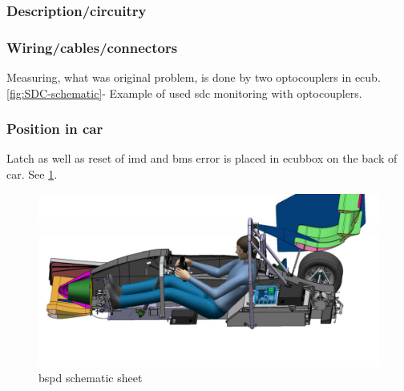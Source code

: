 \subsubsection{Description/circuitry}

\subsubsection{Wiring/cables/connectors}

Measuring, what was original problem, is done by two optocouplers in \gls{ecub}. \ref{fig:SDC-schematic}- Example of used \gls{sdc} monitoring with optocouplers.
\subsubsection{Position in car}
Latch as well as reset of \gls{imd} and \gls{bms} error is placed in \gls{ecub}box on the back of car. See \ref{fig:ecub_position}.

\begin{figure}[H]
	\centering
	\includegraphics[width=\textwidth]{./img/ECUB_POSITION.jpg}
	\caption{\gls{bspd} schematic sheet}
	\label{fig:ecub_position}
\end{figure}